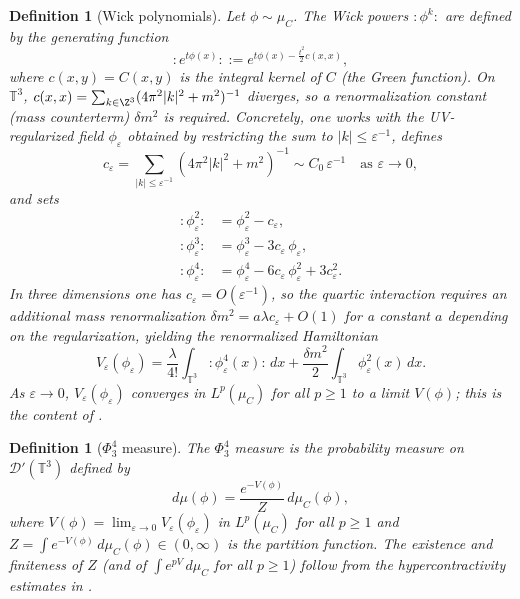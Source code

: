 \documentclass[12pt]{article}
\newtheorem{definition}[theorem]{Definition}
\newcommand{\T}{\mathbb{T}}
\newcommand{\Dc}{\mathcal{D}}
\newcommand{\wick}[1]{:\!#1\!:}
\begin{document}
\begin{definition}[Wick polynomials]\label{def:Wick}
Let $\phi\sim\mu_C$.  The \emph{Wick powers} $\wick{\phi^k}$ are defined by the generating
function
\[
  \wick{e^{t\phi(x)}} := e^{t\phi(x) - \frac{t^2}{2}c(x,x)},
\]
where $c(x,y) = C(x,y)$ is the integral kernel of $C$ (the \emph{Green function}).  On
$\T^3$, $c(x,x) = \sum_{k\in\Z^3}(4\pi^2|k|^2+m^2)^{-1}$ diverges, so a
\emph{renormalization constant} (mass counterterm) $\delta m^2$ is required.  Concretely,
one works with the UV-regularized field $\phi_\varepsilon$ obtained by restricting the sum to
$|k|\le \varepsilon^{-1}$, defines
\[
  c_\varepsilon = \sum_{|k|\le\varepsilon^{-1}}(4\pi^2|k|^2+m^2)^{-1} \sim C_0\,\varepsilon^{-1}
  \quad \text{as }\varepsilon\to 0,
\]
and sets
\begin{align*}
  \wick{\phi_\varepsilon^2} &= \phi_\varepsilon^2 - c_\varepsilon,\\
  \wick{\phi_\varepsilon^3} &= \phi_\varepsilon^3 - 3c_\varepsilon\,\phi_\varepsilon,\\
  \wick{\phi_\varepsilon^4} &= \phi_\varepsilon^4 - 6c_\varepsilon\,\phi_\varepsilon^2
                               + 3c_\varepsilon^2.
\end{align*}
In three dimensions one has $c_\varepsilon=O(\varepsilon^{-1})$, so the quartic interaction
requires an additional mass renormalization $\delta m^2 = a\lambda c_\varepsilon + O(1)$ for a
constant $a$ depending on the regularization, yielding the renormalized Hamiltonian
\[
  V_\varepsilon(\phi_\varepsilon)
  = \frac{\lambda}{4!}\int_{\T^3}\wick{\phi_\varepsilon^4(x)}\,dx
    + \frac{\delta m^2}{2}\int_{\T^3}\phi_\varepsilon^2(x)\,dx.
\]
As $\varepsilon\to 0$, $V_\varepsilon(\phi_\varepsilon)$ converges in $L^p(\mu_C)$ for all
$p\ge 1$ to a limit $V(\phi)$; this is the content of \cite{GlimmJaffe1987}.
\end{definition}

\begin{definition}[$\Phi^4_3$ measure]\label{def:Phi4}
The \emph{$\Phi^4_3$ measure} is the probability measure on $\Dc'(\T^3)$ defined by
\[
  d\mu(\phi) = \frac{e^{-V(\phi)}}{Z}\,d\mu_C(\phi),
\]
where $V(\phi)=\lim_{\varepsilon\to 0}V_\varepsilon(\phi_\varepsilon)$ in $L^p(\mu_C)$ for all
$p\ge 1$ and $Z = \int e^{-V(\phi)}\,d\mu_C(\phi) \in (0,\infty)$ is the partition function.
The existence and finiteness of $Z$ (and of $\int e^{pV}\,d\mu_C$ for all $p\ge 1$) follow
from the hypercontractivity estimates in \cite{NelsonHyper1973,GlimmJaffe1987}.
\end{definition}
\end{document}
